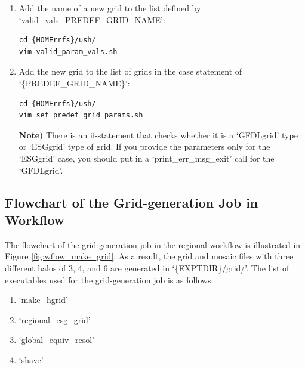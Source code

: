 \documentclass[11pt,fleqn]{report}              %
\begin{document}
\begin{enumerate}
\item Add the name of a new grid to the list defined by `valid\_vals\_PREDEF\_GRID\_NAME':
\lstset{language=bash}   
\begin{lstlisting}[frame=trBL]
cd {HOMErrfs}/ush/
vim valid_param_vals.sh
\end{lstlisting}

\item Add the new grid to the list of grids in the case statement of `\{PREDEF\_GRID\_NAME\}':
\lstset{language=bash}   
\begin{lstlisting}[frame=trBL]
cd {HOMErrfs}/ush/
vim set_predef_grid_params.sh
\end{lstlisting}

{\bf Note)} There is an if-statement that checks whether it is a `GFDLgrid' type or `ESGgrid' type of grid. If you provide the parameters only for the `ESGgrid' case, you should put in a `print\_err\_msg\_exit' call for the `GFDLgrid'.

\end{enumerate}



\subsection{Flowchart of the Grid-generation Job in Workflow}
\label{subsec:wflow_make_grid_flowchart}

The flowchart of the grid-generation job in the regional workflow is illustrated in Figure \ref{fig:wflow_make_grid}. As a result, the grid and mosaic files with three different halos of 3, 4, and 6 are generated in `\{EXPTDIR\}/grid/'. The list of executables used for the grid-generation job is as follows:
\begin{enumerate}
\item `make\_hgrid'
\item `regional\_esg\_grid'
\item `global\_equiv\_resol'
\item `shave'
\end{enumerate}
\end{document}
